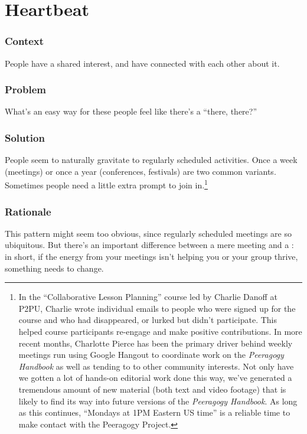 \section{Heartbeat}\label{sec:Heartbeat}

\subsubsection*{Context}
People have a shared interest, and have connected with each other about it.

\subsubsection*{Problem} What's an easy way for these people feel like there's a ``there, there?''

\subsubsection*{Solution} People seem to naturally gravitate to regularly scheduled
activities. Once a week (meetings) or once a year (conferences, festivals) are two common variants.  Sometimes people need a little extra prompt to join in.\footnote{In the ``Collaborative Lesson Planning'' course led
by Charlie Danoff at P2PU, Charlie wrote individual emails to people who
were signed up for the course and who had disappeared, or lurked but
didn't participate. This helped course participants
re-engage and make positive contributions. In more recent
months, Charlotte Pierce has been the primary driver behind weekly meetings run using Google
Hangout to coordinate work on the \emph{Peeragogy Handbook} as well as tending to to other community interests. Not only have we
gotten a lot of hands-on editorial work done this way, we've generated a
tremendous amount of new material (both text and video footage) that is
likely to find its way into future versions of the \emph{Peeragogy Handbook}.  As long as this continues, ``Mondays at 1PM Eastern US time'' is a reliable time to make contact with the Peeragogy Project.}

\subsubsection*{Rationale}  This pattern might seem too obvious, since regularly scheduled meetings are so ubiquitous.  But there's an important difference between a mere meeting and a : in short, if the energy from your meetings isn't helping you or your group thrive, something needs to change.

